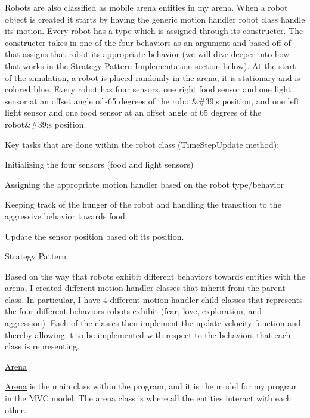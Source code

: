 Robots are also classified as mobile arena entities in my arena. When a robot object is created it starts by having the generic motion handler robot class handle its motion. Every robot has a type which is assigned through its constructer. The constructer takes in one of the four behaviors as an argument and based off of that assigns that robot its appropriate behavior (we will dive deeper into how that works in the Strategy Pattern Implementation section below). At the start of the simulation, a robot is placed randomly in the arena, it is stationary and is colored blue. Every robot has four sensors, one right food sensor and one light sensor at an offset angle of -\/65 degrees of the robot\&\#39;s position, and one left light sensor and one food sensor at an offset angle of 65 degrees of the robot\&\#39;s position.

Key tasks that are done within the robot class (Time\+Step\+Update method)\+:


\begin{DoxyItemize}
\item Initializing the four sensors (food and light sensors)
\item Assigning the appropriate motion handler based on the robot type/behavior
\item Keeping track of the hunger of the robot and handling the transition to the aggressive behavior towards food.
\item Update the sensor position based off its position.
\item Strategy Pattern
\begin{DoxyItemize}
\item Based on the way that robots exhibit different behaviors towards entities with the arena, I created different motion handler classes that inherit from the parent class. In particular, I have 4 different motion handler child classes that represents the four different behaviors robots exhibit (fear, love, exploration, and aggression). Each of the classes then implement the update velocity function and thereby allowing it to be implemented with respect to the behaviors that each class is representing.
\end{DoxyItemize}
\end{DoxyItemize}

\mbox{\hyperlink{class_arena}{Arena}}

\mbox{\hyperlink{class_arena}{Arena}} is the main class within the program, and it is the model for my program in the M\+VC model. The arena class is where all the entities interact with each other.

